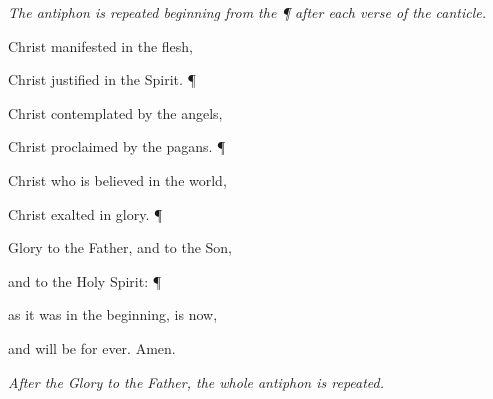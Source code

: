 \emph{The antiphon is repeated beginning from the \emph{¶} after each verse of the canticle.} \vspace{5pt}

\noindent Christ manifested in the flesh,~\GreStar{}~\nopagebreak

Christ justified in the Spirit. ¶

\noindent Christ contemplated by the angels,~\GreStar{}~\nopagebreak

Christ proclaimed by the pagans. ¶

\noindent Christ who is believed in the world,~\GreStar{}~\nopagebreak

Christ exalted in glory. ¶

\noindent Glory to the Father, and to the Son,~\GreStar{}~\nopagebreak

and to the Holy Spirit: ¶

\noindent as it was in the beginning, is now,~\GreStar{}~\nopagebreak

and will be for ever. Amen.

\vspace{5pt} \emph{After the \emph{Glory to the Father,} the whole antiphon is repeated.}
